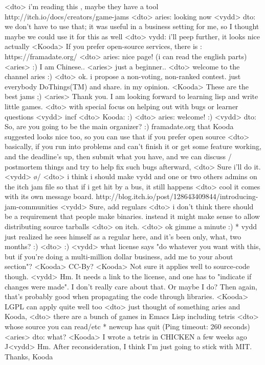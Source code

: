 \documentclass[a4paper,11pt]{article}
\begin{document}
<dto> i'm reading this , maybe they have a tool http://itch.io/docs/creators/game-jams
<dto> aries: looking now
<vydd> dto: we don't have to use that; it was useful in a business setting for me, so I thought maybe we could use it for this as well
<dto> vydd: i'll peep further, it looks nice actually
<Kooda> If you prefer open-source services, there is : https://framadate.org/
<dto> aries: nice page! (i can read the english parts)
<aries> :) I am Chinese..
<aries> just a beginner..
<dto> welcome to the channel aries :)
<dto> ok. i propose a non-voting, non-ranked contest. just everybody DoThings(TM) and share. in my opinion.
<Kooda> These are the best jams ;)
<aries> Thank you. I am looking forward to learning lisp and write little games. 
<dto> with special focus on helping out with bugs or learner questions
<vydd> incf
<dto> Kooda: :)
<dto> aries: welcome! :)
<vydd> dto: So, are you going to be the main organizer? :) framadate.org that Kooda suggested looks nice too, so you can use that if you prefer open source
<dto> basically, if you run into problems and can't finish it or get some feature working, and the deadline's up, then submit what you have, and we can discuss / postmortem things and try to help fix such bugs afterward,
<dto> Sure i'll do it.
<vydd> \o/
<dto> i think i should make vydd and one or two others admins on the itch jam file so that if i get hit by a bus, it still happens
<dto> cool it comes with its own message board. http://blog.itch.io/post/128643409844/introducing-jam-communities
<vydd> Sure, add regulars
<dto> i don't think there should be a requirement that people make binaries. instead it might make sense to allow distributing source tarballs
<dto> on itch.
<dto> ok gimme a minute :)
* vydd just realized he sees himself as a regular here, and it's been only, what, two months? :)
<dto> :)
<vydd> what license says "do whatever you want with this, but if you're doing a multi-million dollar business, add me to your about section"?
<Kooda> CC-By?
<Kooda> Not sure it applies well to source-code though.
<vydd> Hm. It needs a link to the license, and one has to "indicate if changes were made". I don't really care about that. Or maybe I do? Then again, that's probably good when propagating the code through libraries.
<Kooda> LGPL can apply quite well too
<dto> just thought of something aries and Kooda,
<dto> there are a bunch of games in Emacs Lisp including tetris
<dto> whose source you can read/etc
* newcup has quit (Ping timeout: 260 seconds)
<aries> dto: what?
<Kooda> I wrote a tetris in CHICKEN a few weeks ago ^^
<vydd> Hm. After reconsideration, I think I'm just going to stick with MIT. Thanks, Kooda
\end{document}
